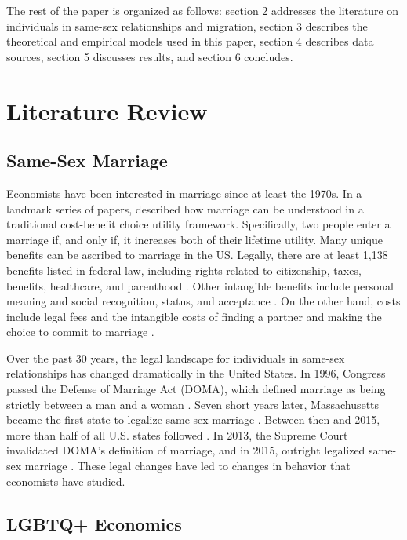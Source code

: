 \documentclass[12pt,letterpaper]{article}
\begin{document}
The rest of the paper is organized as follows: section 2 addresses the literature on individuals in same-sex relationships and migration, section 3 describes the theoretical and empirical models used in this paper, section 4 describes data sources, section 5 discusses results, and section 6 concludes.

\section{Literature Review}
\subsection{Same-Sex Marriage}
Economists have been interested in marriage since at least the 1970s. In a landmark series of papers, \citet{9} described how marriage can be understood in a traditional cost-benefit choice utility framework. Specifically, two people enter a marriage if, and only if, it increases both of their lifetime utility. Many unique benefits can be ascribed to marriage in the US. Legally, there are at least 1,138 benefits listed in federal law, including rights related to citizenship, taxes, benefits, healthcare, and parenthood \citep{1, 8}. Other intangible benefits include personal meaning and social recognition, status, and acceptance \citep{8}. On the other hand, costs include legal fees and the intangible costs of finding a partner and making the choice to commit to marriage \citep{9}. 

Over the past 30 years, the legal landscape for individuals in same-sex relationships has changed dramatically in the United States. In 1996, Congress passed the Defense of Marriage Act (DOMA), which defined marriage as being strictly between a man and a woman \citep{5}. Seven short years later, Massachusetts became the first state to legalize same-sex marriage \citep{1, 3, 5}. Between then and 2015, more than half of all U.S. states followed \citep{12}. In 2013, the Supreme Court invalidated DOMA’s definition of marriage, and in 2015, outright legalized same-sex marriage \citep{1, 3, 5, 12}. These legal changes have led to changes in behavior that economists have studied.

\subsection{LGBTQ+ Economics}
\end{document}
